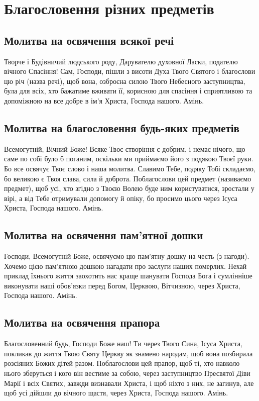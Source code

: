 \documentclass[chapters.tex]{subfiles}
\begin{document}
\chapter{Благословення різних предметів}
\section{Молитва на освячення всякої речі}
Творче і Будівничий людського роду, Дарувателю духовної Ласки, подателю вічного Спасіння! Сам, Господи, пішли з висоти Духа Твого Святого і благослови цю річ (назва речі), щоб вона, озброєна силою Твого Небесного заступництва, була для всіх, хто бажатиме вживати її, корисною для спасіння і сприятливою та допоміжною на все добре в ім’я Христа, Господа нашого. Амінь.

\section{Молитва на благословення будь-яких предметів}
Всемогутній, Вічний Боже! Всяке Твоє створіння є добрим, і немає нічого, що саме по собі було б поганим, оскільки ми приймаємо його з подякою Твоєї руки. Бо все освячує Твоє слово і наша молитва. Славимо Тебе, подяку Тобі складаємо, бо великою є Твоя слава, сила й доброта. Поблагослови цей предмет (називаємо предмет), щоб усі, хто згідно з Твоєю Волею буде ним користуватися, зростали у вірі, а від Тебе отримували допомогу й опіку, бо просимо цього через Ісуса Христа, Господа нашого. Амінь.

\section{Молитва на освячення пам’ятної дошки}
Господи, Всемогутній Боже, освячуємо цю пам’ятну дошку на честь (з нагоди). Хочемо цією пам’ятною дошкою нагадати про заслуги наших померлих. Нехай приклад їхнього життя заохотить нас краще шанувати Господа Бога і сумлінніше виконувати наші обов’язки перед Богом, Церквою, Вітчизною, через Христа, Господа нашого. Амінь.

\section{Молитва на освячення прапора}
Благословенний будь, Господи Боже наш! Ти через Твого Сина, Ісуса Христа, покликав до життя Твою Святу Церкву як знамено народам, щоб вона позбирала розсіяних Божих дітей разом. Поблагослови цей прапор, щоб ті, хто навколо нього зберуться і кого він вестиме за собою, через заступництво Пресвятої Діви Марії і всіх Святих, завжди визнавали Христа, і щоб ніхто з них, не загинув, але щоб усі дійшли до вічного щастя, через Христа, Господа нашого. Амінь.
\end{document}
